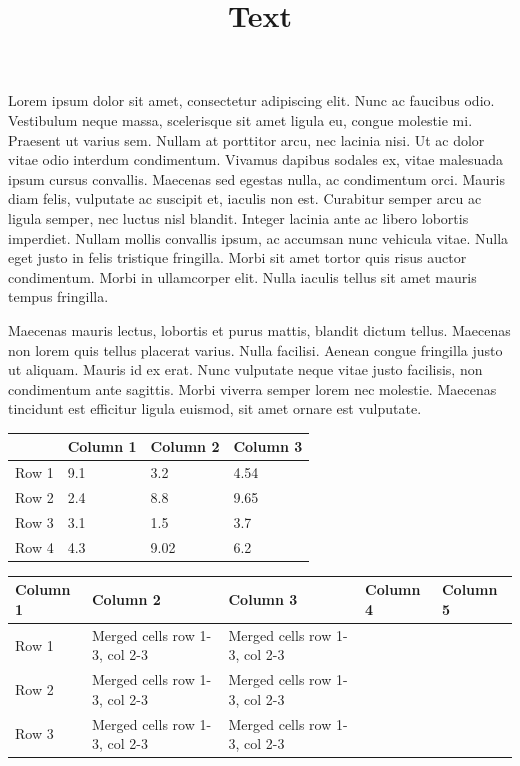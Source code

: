 \documentclass[11pt,a4paper]{article}
\title{Text}
\begin{document}
\maketitle

Lorem ipsum dolor sit amet, consectetur adipiscing elit. Nunc ac faucibus odio. Vestibulum neque massa, scelerisque sit amet ligula eu, congue molestie mi. Praesent ut varius sem. Nullam at porttitor arcu, nec lacinia nisi. Ut ac dolor vitae odio interdum condimentum. Vivamus dapibus sodales ex, vitae malesuada ipsum cursus convallis. Maecenas sed egestas nulla, ac condimentum orci. Mauris diam felis, vulputate ac suscipit et, iaculis non est. Curabitur semper arcu ac ligula semper, nec luctus nisl blandit. Integer lacinia ante ac libero lobortis imperdiet. Nullam mollis convallis ipsum, ac accumsan nunc vehicula vitae. Nulla eget justo in felis tristique fringilla. Morbi sit amet tortor quis risus auctor condimentum. Morbi in ullamcorper elit. Nulla iaculis tellus sit amet mauris tempus fringilla.

Maecenas mauris lectus, lobortis et purus mattis, blandit dictum tellus. Maecenas non lorem quis tellus placerat varius. Nulla facilisi. Aenean congue fringilla justo ut aliquam. Mauris id ex erat. Nunc vulputate neque vitae justo facilisis, non condimentum ante sagittis. Morbi viverra semper lorem nec molestie. Maecenas tincidunt est efficitur ligula euismod, sit amet ornare est vulputate.

\begin{figure}[h]
\end{figure}

\begin{table}[h]
\begin{tabular}{|l|l|l|l|}
\hline
 & Column 1 & Column 2 & Column 3 \\ \hline
Row 1 & 9.1 & 3.2 & 4.54 \\ \hline
Row 2 & 2.4 & 8.8 & 9.65 \\ \hline
Row 3 & 3.1 & 1.5 & 3.7 \\ \hline
Row 4 & 4.3 & 9.02 & 6.2 \\ \hline
\end{tabular}
\end{table}

\begin{table}[h]
\begin{tabular}{|l|l|l|l|l|}
\hline
Column 1 & Column 2 & Column 3 & Column 4 & Column 5 \\ \hline
Row 1 & Merged cells row 1-3, col 2-3 & Merged cells row 1-3, col 2-3 &  &  \\ \hline
Row 2 & Merged cells row 1-3, col 2-3 & Merged cells row 1-3, col 2-3 &  &  \\ \hline
Row 3 & Merged cells row 1-3, col 2-3 & Merged cells row 1-3, col 2-3 &  &  \\ \hline
\end{tabular}
\end{table}
\end{document}
